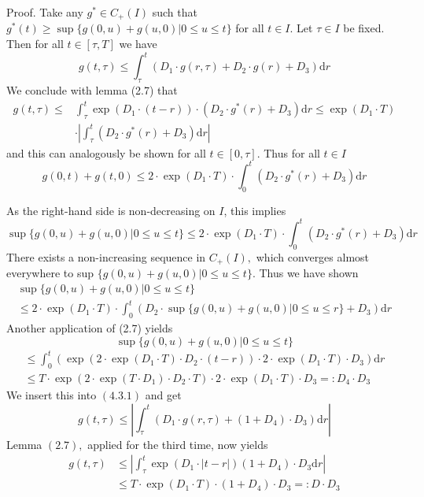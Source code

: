 Proof. Take any $g^{*} \in C_{+}(I)$ such that $g^{*}(t) \geqslant \sup \{g(0, u)+g(u, 0) | 0 \leqslant u \leqslant t\}$
for all $t \in I .$ Let $\tau \in I$ be fixed. Then for all $t \in[\tau, T]$ we have
\[
g(t, \tau) \leqslant \int_{\tau}^{t}\left(D_{1} \cdot g(r, \tau)+D_{2} \cdot g(r)+D_{3}\right) \mathrm{d} r
\]
We conclude with lemma (2.7) that
\[
\begin{aligned}
g(t, \tau) \leqslant & \int_{\tau}^{t} \exp \left(D_{1} \cdot(t-r)\right) \cdot\left(D_{2} \cdot g^{*}(r)+D_{3}\right) \mathrm{d} r \leqslant \exp \left(D_{1} \cdot T\right) \\
& \cdot\left|\int_{\tau}^{t}\left(D_{2} \cdot g^{*}(r)+D_{3}\right) \mathrm{d} r\right|
\end{aligned}
\]
and this can analogously be shown for all $t \in[0, \tau] .$ Thus for all $t \in I$
\[
g(0, t)+g(t, 0) \leqslant 2 \cdot \exp \left(D_{1} \cdot T\right) \cdot \int_{0}^{t}\left(D_{2} \cdot g^{*}(r)+D_{3}\right) \mathrm{d} r
\]

As the right-hand side is non-decreasing on $I$, this implies
\[
\sup \{g(0, u)+g(u, 0) | 0 \leqslant u \leqslant t\} \leqslant 2 \cdot \exp \left(D_{1} \cdot T\right) \cdot \int_{0}^{t}\left(D_{2} \cdot g^{*}(r)+D_{3}\right) \mathrm{d} r
\]
There exists a non-increasing sequence in $C_{+}(I),$ which converges almost everywhere to sup $\{g(0, u)+g(u, 0) | 0 \leqslant u \leqslant t\} .$ Thus we have shown
\[
\begin{array}{l}
\sup \{g(0, u)+g(u, 0) | 0 \leqslant u \leqslant t\} \\
\leqslant 2 \cdot \exp \left(D_{1} \cdot T\right) \cdot \int_{0}^{t}\left(D_{2} \cdot \sup \{g(0, u)+g(u, 0) | 0 \leqslant u \leqslant r\}+D_{3}\right) \mathrm{d} r
\end{array}
\]
Another application of (2.7) yields
\[
\sup \{g(0, u)+g(u, 0) | 0 \leqslant u \leqslant t\}
\]
\[
\begin{array}{l}
\leqslant \int_{0}^{t}\left(\exp \left(2 \cdot \exp \left(D_{1} \cdot T\right) \cdot D_{2} \cdot(t-r)\right) \cdot 2 \cdot \exp \left(D_{1} \cdot T\right) \cdot D_{3}\right) \mathrm{d} r \\
\leqslant T \cdot \exp \left(2 \cdot \exp \left(T \cdot D_{1}\right) \cdot D_{2} \cdot T\right) \cdot 2 \cdot \exp \left(D_{1} \cdot T\right) \cdot D_{3}=: D_{4} \cdot D_{3}
\end{array}
\]
We insert this into $(4.3 .1)$ and get
\[
g(t, \tau) \leqslant\left|\int_{\tau}^{t}\left(D_{1} \cdot g(r, \tau)+\left(1+D_{4}\right) \cdot D_{3}\right) \mathrm{d} r\right|
\]
Lemma $(2.7),$ applied for the third time, now yields
\[
\begin{aligned}
g(t, \tau) & \leqslant\left|\int_{\tau}^{t} \exp \left(D_{1} \cdot|t-r|\right)\left(1+D_{4}\right) \cdot D_{3} \mathrm{d} r\right| \\
& \leqslant T \cdot \exp \left(D_{1} \cdot T\right) \cdot\left(1+D_{4}\right) \cdot D_{3}=: D \cdot D_{3}
\end{aligned}
\]



